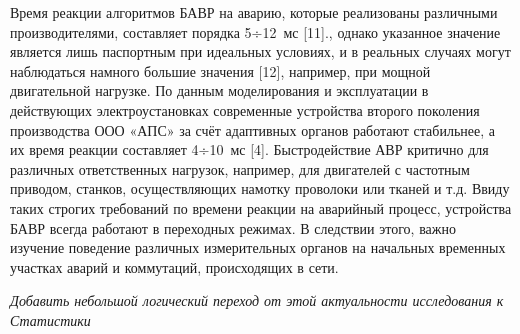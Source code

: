 Время реакции алгоритмов БАВР на аварию, которые реализованы различными производителями, составляет порядка 5÷12 мс [11]., однако указанное значение является лишь паспортным при идеальных условиях, и в реальных случаях могут наблюдаться намного большие значения [12], например, при мощной двигательной нагрузке. По данным моделирования и эксплуатации в действующих электроустановках современные устройства второго поколения производства ООО «АПС» за счёт адаптивных органов работают стабильнее, а их время реакции составляет 4÷10 мс [4]. Быстродействие АВР критично для различных ответственных нагрузок, например, для двигателей с частотным приводом, станков, осуществляющих намотку проволоки или тканей и т.д. Ввиду таких строгих требований по времени реакции на аварийный процесс, устройства БАВР всегда работают в переходных режимах. В следствии этого, важно изучение поведение различных измерительных органов на начальных временных участках аварий и коммутаций, происходящих в сети.\par\vspace{0.2cm}

\noindent\textit{Добавить небольшой логический переход от этой актуальности исследования к Статистики}\par\vspace{0.3cm}

\par\vspace{0.3cm}